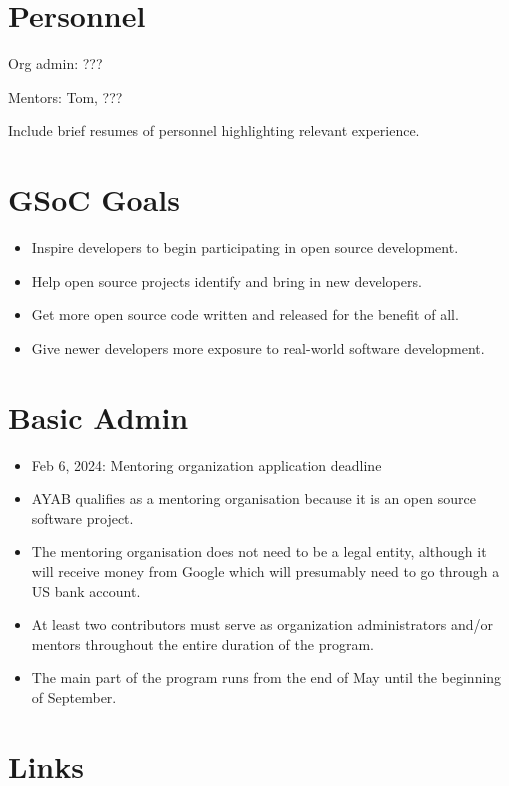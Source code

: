 \documentclass{article}
\begin{document}
\section{Personnel}

\begin{flushleft}
Org admin: ???

Mentors: Tom, ???

Include brief resumes of personnel highlighting relevant experience.
\end{flushleft}


\section{GSoC Goals}

\begin{itemize}
\item Inspire developers to begin participating in open source development.
\item Help open source projects identify and bring in new developers.
\item Get more open source code written and released for the benefit of all.
\item Give newer developers more exposure to real-world software development.
\end{itemize}


\section{Basic Admin}

\begin{itemize}
\item Feb 6, 2024: Mentoring organization application deadline
\item AYAB qualifies as a mentoring organisation because it is an open source software project.
\item The mentoring organisation does not need to be a legal entity, although it will receive money from Google which will presumably need to go through a US bank account.
\item At least two contributors must serve as organization administrators and/or mentors throughout the entire duration of the program.
\item The main part of the program runs from the end of May until the beginning of September.
\end{itemize}


\section{Links}
\end{document}
